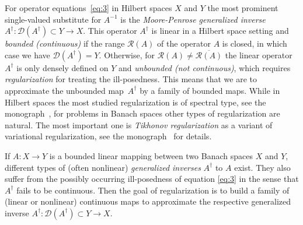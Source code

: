 \documentclass[12pt]{amsart}
\newcommand{\domain}{\mathcal D}
\newcommand{\range}{\mathcal R}
\newcommand{\Ad}{A^\dag}
\theoremstyle{remark}
\begin{document}
For operator equations~\eqref{eq:3} in Hilbert spaces $X$ and $Y$ the most prominent single-valued substitute for $A^{-1}$ is the
\emph{Moore-Penrose generalized inverse}~$\Ad\colon \domain(\Ad) \subset Y \to X$.
This operator $\Ad$ is linear in a Hilbert space setting and \emph{bounded (continuous)} if 
the range $\range(A)$ of the operator $A$ is closed, in which case we have $\domain(\Ad)=Y$. Otherwise, for $\range(A) \not=\overline{\range(A)}$
the linear operator $\Ad$ is only densely defined on $Y$ and \emph{unbounded (not continuous)}, which requires
\emph{regularization} for treating the ill-posedness.  This means
that we are to approximate the unbounded map~$\Ad$ by a family of
bounded maps. While in Hilbert spaces the most studied regularization
is of spectral type, see the monograph~\cite{MR1408680}, for problems
in Banach spaces other types of regularization are natural. The most
important one is \emph{Tikhonov regularization} as a variant of variational regularization, see the
monograph~\cite{MR2963507} for details.

If $A: X \to Y$ is a bounded linear mapping between two Banach spaces $X$ and $Y$, different types of (often nonlinear) \emph{generalized inverses} $\Ad$ to $A$ exist. They also suffer from the possibly occurring ill-posedness of equation \eqref{eq:3} in the sense that $\Ad$ fails to be continuous. Then the goal of regularization is to build a family of (linear or nonlinear) continuous maps to approximate the respective generalized inverse $\Ad\colon \domain(\Ad) \subset Y \to X$.
\end{document}
